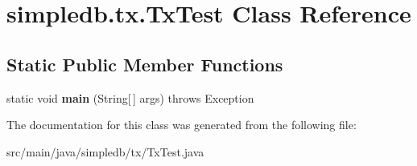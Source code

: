 \hypertarget{classsimpledb_1_1tx_1_1TxTest}{}\section{simpledb.\+tx.\+Tx\+Test Class Reference}
\label{classsimpledb_1_1tx_1_1TxTest}
\subsection*{Static Public Member Functions}
\begin{DoxyCompactItemize}
\item 
\mbox{\label{classsimpledb_1_1tx_1_1TxTest_ad5c5f3e4487517214d345353f20f9c9d}} 
static void {\bfseries main} (String\mbox{[}$\,$\mbox{]} args)  throws Exception 
\end{DoxyCompactItemize}


The documentation for this class was generated from the following file\+:\begin{DoxyCompactItemize}
\item 
src/main/java/simpledb/tx/Tx\+Test.\+java\end{DoxyCompactItemize}
